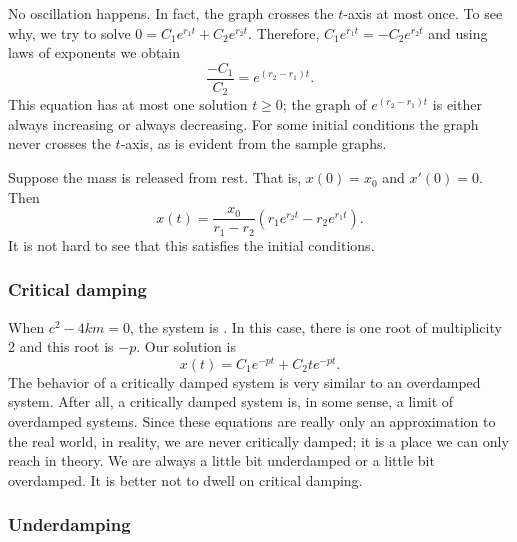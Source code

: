 
No oscillation happens.  In fact, the graph crosses the
$t$-axis at most once.  To see why, we try to solve
$0 = C_1 e^{r_1 t} + C_2 e^{r_2 t}$.
Therefore, $C_1 e^{r_1 t} = - C_2 e^{r_2 t}$ and using laws of exponents we
obtain
\begin{equation*}
\frac{-C_1}{C_2} = e^{(r_2-r_1) t} .
\end{equation*}
This equation has at most one solution $t \geq 0$;
the graph of $e^{(r_2-r_1) t}$ is either always increasing
or always decreasing.
For some initial conditions the graph never crosses the $t$-axis, as is
evident from the sample graphs.

\begin{example}
Suppose the mass is released from rest.  That is,
$x(0) = x_0$ and $x'(0) = 0$.
Then
\begin{equation*}
x(t) = \frac{x_0}{r_1-r_2} \left(r_1 e^{r_2 t} - r_2 e^{r_1 t} \right) .
\end{equation*}
It is not hard to see that this satisfies the initial conditions.
\end{example}

\subsubsection{Critical damping}

When
$c^2 - 4km = 0$, the system is \emph{}.  In this case,
there is one root of multiplicity 2 and this root is $-p$.  Our solution is
\begin{equation*}
x(t) = C_1 e^{-pt} + C_2 t e^{-pt} .
\end{equation*}
The behavior of a critically damped system is very similar to an overdamped
system.  After all, a critically damped system is, in some sense, a limit
of overdamped systems.  Since these equations are really only an
approximation to the real world, in reality, we are never critically
damped; it is a place we can only reach in theory.  We are always
a little bit underdamped or a little bit overdamped.  It is better not to
dwell on critical damping.

\subsubsection{Underdamping}


